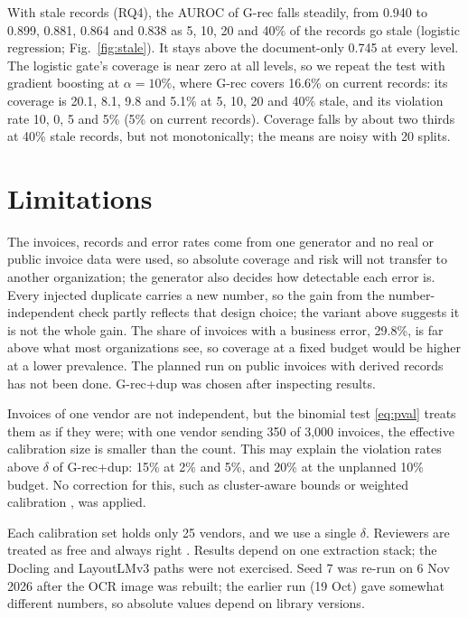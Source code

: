 \documentclass[conference]{IEEEtran}
\newcommand{\sysP}{\textsf{G-rec}}         %
\newcommand{\sysPdup}{\textsf{G-rec+dup}}  %
\begin{document}
With stale records (RQ4), the AUROC of \sysP{} falls steadily, from 0.940 to
0.899, 0.881, 0.864 and 0.838 as 5, 10, 20 and 40\% of the records go stale
(logistic regression; Fig.~\ref{fig:stale}). It stays above the document-only
0.745 at every level. The logistic gate's coverage is near zero at all levels,
so we repeat the test with gradient boosting at $\alpha=10\%$, where \sysP{}
covers 16.6\% on current records: its coverage is 20.1, 8.1, 9.8 and 5.1\% at 5, 10, 20 and 40\%
stale, and its violation rate 10, 0, 5 and 5\% (5\% on current records). Coverage falls by about two thirds at 40\% stale
records, but not monotonically; the means are noisy with 20 splits.

\section{Limitations}\label{sec:limits}
The invoices, records and error rates come from one generator and no real or
public invoice data were used, so absolute coverage and risk will not transfer to
another organization; the generator also decides how detectable each error is.
Every injected duplicate carries a new number, so the gain from the
number-independent check partly reflects that design choice; the variant above suggests it is not the whole gain. The share of
invoices with a business error, 29.8\%, is far above what most organizations
see, so coverage at a fixed budget would
be higher at a lower prevalence. The planned run on public
invoices with derived records has not been done. \sysPdup{} was chosen after inspecting results.

Invoices of one vendor are not independent, but the binomial test \eqref{eq:pval} treats them as
if they were; with one vendor sending 350 of 3,000 invoices, the effective
calibration size is smaller than the count. This may
explain the violation rates above $\delta$ of \sysPdup{}: 15\% at 2\% and 5\%, and 20\% at the
unplanned 10\% budget. No correction for this, such as cluster-aware bounds or
weighted calibration \cite{tibshirani2019}, was applied.

Each calibration set holds only 25 vendors, and we use a single $\delta$. Reviewers are treated as free
and always right \cite{mozannar2020}. Results depend on one extraction stack; the Docling and LayoutLMv3 paths were not exercised.
Seed 7 was re-run on 6 Nov 2026 after the OCR image was rebuilt; the earlier run (19 Oct) gave somewhat different
numbers, so absolute values depend on library versions.
\end{document}
